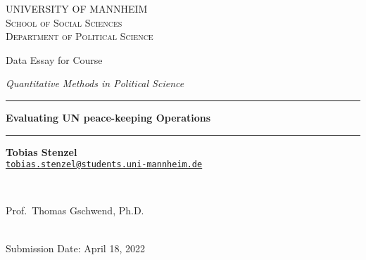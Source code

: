 \documentclass[12pt,english,a4paper,oneside]{article}
\begin{document}
\begin{titlepage}

    \begin{center}
    \large{ \textsc{ \uppercase{University of Mannheim} \\ \vspace{-0.2cm}
School of Social Sciences \\ \vspace{-0.2cm}
Department of Political Science}}

      
        \vspace{3.5cm}
        

       \large{   Data Essay for Course   }


       \large{ \textit{   Quantitative Methods in Political Science   }}

\renewcommand{\linethickness}{0.03em}
\rule{\linewidth}{\linethickness}


       \LARGE{ \textbf{   Evaluating UN peace-keeping Operations   }}


       \large{  }

        \vspace{-0.2cm}
\rule{\linewidth}{\linethickness}


\begin{minipage}[t]{0.5\textwidth}
\begin{flushleft}
\singlespacing
 \textbf{Tobias Stenzel}  \\ 


 \href{mailto:tobias.stenzel@students.uni-mannheim.de}{\nolinkurl{tobias.stenzel@students.uni-mannheim.de}}  \\ 

\end{flushleft}
\end{minipage}
\begin{minipage}[t]{0.4\textwidth}
\hfill
\end{minipage}\\
\vspace{0.2cm}
\begin{minipage}[t]{0.35\textwidth}
\hfill
\end{minipage}
\begin{minipage}[t]{0.55\textwidth}
\begin{flushright}
\singlespacing
     Prof.~Thomas Gschwend, Ph.D.  \\       

\end{flushright}
\end{minipage}\\
%


         \vfill
         Submission Date: April 18, 2022 \\ 
        





         \vfill



     \end{center}
    \thispagestyle{empty}
\end{titlepage}
\end{document}
